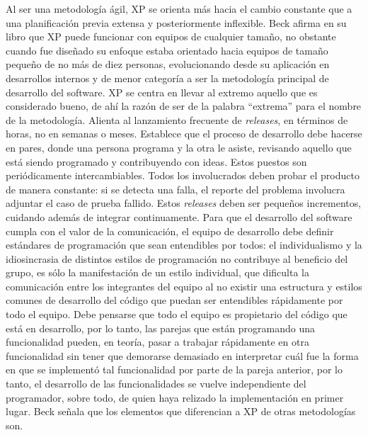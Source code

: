 Al ser una metodología ágil, XP se orienta más hacia el cambio constante que a una planificación previa extensa y posteriormente inflexible. Beck afirma en su libro que XP puede funcionar con equipos de cualquier tamaño, no obstante cuando fue diseñado su enfoque estaba orientado hacia equipos de tamaño pequeño de no más de diez personas, evolucionando desde su aplicación en desarrollos internos y de menor categoría a ser la metodología principal de desarrollo del software.
XP se centra en llevar al extremo aquello que es considerado bueno, de ahí la razón de ser de la palabra ``extrema'' para el nombre de la metodología. Alienta al lanzamiento frecuente de \textit{releases}, en términos de horas, no en semanas o meses. Establece que el proceso de desarrollo debe hacerse en pares, donde una persona programa y la otra le asiste, revisando aquello que está siendo programado y contribuyendo con ideas. Estos puestos son periódicamente intercambiables. Todos los involucrados deben probar el producto de manera constante: si se detecta una falla, el reporte del problema involucra adjuntar el caso de prueba fallido. Estos \textit{releases} deben ser pequeños incrementos, cuidando además de integrar continuamente. Para que el desarrollo del software cumpla con el valor de la comunicación, el equipo de desarrollo debe definir estándares de programación que sean entendibles por todos: el individualismo y la idiosincrasia de distintos estilos de programación no contribuye al beneficio del grupo, es sólo la manifestación de un estilo individual, que dificulta la comunicación entre los integrantes del equipo al no existir una estructura y estilos comunes de desarrollo del código que puedan ser entendibles rápidamente por todo el equipo. Debe pensarse que todo el equipo es propietario del código que está en desarrollo, por lo tanto, las parejas que están programando una funcionalidad pueden, en teoría, pasar a trabajar rápidamente en otra funcionalidad sin tener que demorarse demasiado en interpretar cuál fue la forma en que se implementó tal funcionalidad por parte de la pareja anterior, por lo tanto, el desarrollo de las funcionalidades se vuelve independiente del programador, sobre todo, de quien haya relizado la implementación en primer lugar.
Beck señala que los elementos que diferencian a XP de otras metodologías son.

